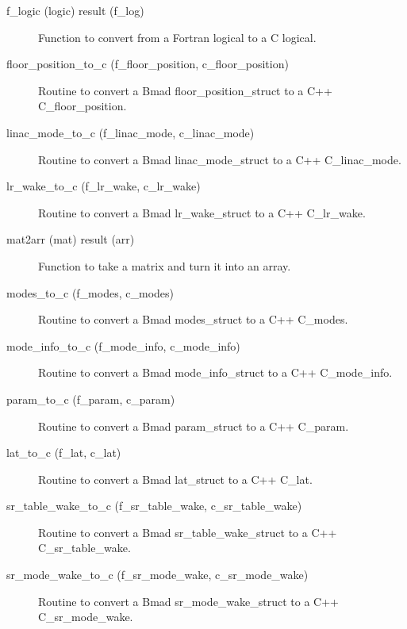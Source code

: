 \begin{description}
\label{r:f.logic}
\item[f_logic (logic) result (f_log)] \Newline 
Function to convert from a Fortran logical to a C logical.

\label{r:floor.position.to.c}
\item[floor_position_to_c (f_floor_position, c_floor_position)] \Newline 
Routine to convert a Bmad floor_position_struct to a C++ C_floor_position.

\label{r:linac.mode.to.c}
\item[linac_mode_to_c (f_linac_mode, c_linac_mode)] \Newline 
Routine to convert a Bmad linac_mode_struct to a C++ C_linac_mode.

\label{r:lr.wake.to.c}
\item[lr_wake_to_c (f_lr_wake, c_lr_wake)] \Newline 
Routine to convert a Bmad lr_wake_struct to a C++ C_lr_wake.

\label{r:mat2arr}
\item[mat2arr (mat) result (arr)] \Newline 
Function to take a matrix and turn it into an array.

\label{r:modes.to.c}
\item[modes_to_c (f_modes, c_modes)] \Newline 
Routine to convert a Bmad modes_struct to a C++ C_modes.

\label{r:mode.info.to.c}
\item[mode_info_to_c (f_mode_info, c_mode_info)] \Newline 
Routine to convert a Bmad mode_info_struct to a C++ C_mode_info.

\label{r:param.to.c}
\item[param_to_c (f_param, c_param)] \Newline 
Routine to convert a Bmad param_struct to a C++ C_param.

\label{r:lat.to.c}
\item[lat_to_c (f_lat, c_lat)] \Newline 
Routine to convert a Bmad lat_struct to a C++ C_lat.

\label{r:sr.table.wake.to.c}
\item[sr_table_wake_to_c (f_sr_table_wake, c_sr_table_wake)] \Newline 
Routine to convert a Bmad sr_table_wake_struct to a C++ C_sr_table_wake.

\label{r:sr.mode.wake.to.c}
\item[sr_mode_wake_to_c (f_sr_mode_wake, c_sr_mode_wake)] \Newline 
Routine to convert a Bmad sr_mode_wake_struct to a C++ C_sr_mode_wake.


\end{description}
